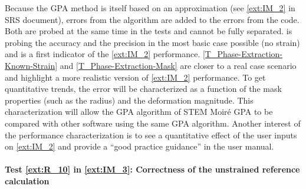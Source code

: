 \documentclass[12pt, titlepage]{article}
\newcommand{\progname}{STEM Moir{\'e} GPA}
\begin{document}
Because the GPA method is itself based on an approximation (see \cref{ext:IM_2} in SRS document), errors from the algorithm are added to the errors from the code. Both are probed at the same time in the tests and cannot be fully separated.  is probing the accuracy and the precision in the most basic case possible (no strain) and is a first indicator of the \cref{ext:IM_2} performance. \cref{T_Phase-Extraction-Known-Strain} and \cref{T_Phase-Extraction-Mask} are closer to a real case scenario and highlight a more realistic version of \cref{ext:IM_2} performance. To get quantitative trends, the error will be characterized as a function of the mask properties (such as the radius) and the deformation magnitude. This characterization will allow the GPA algorithm of \progname{} to be compared with other software using the same GPA algorithm. Another interest of the performance characterization is to see a quantitative effect of the user inputs on \cref{ext:IM_2} and provide a ``good practice guidance'' in the user manual.

\paragraph{Test \cref{ext:R_10} in \cref{ext:IM_3}: Correctness of the unstrained reference calculation}	
\end{document}
